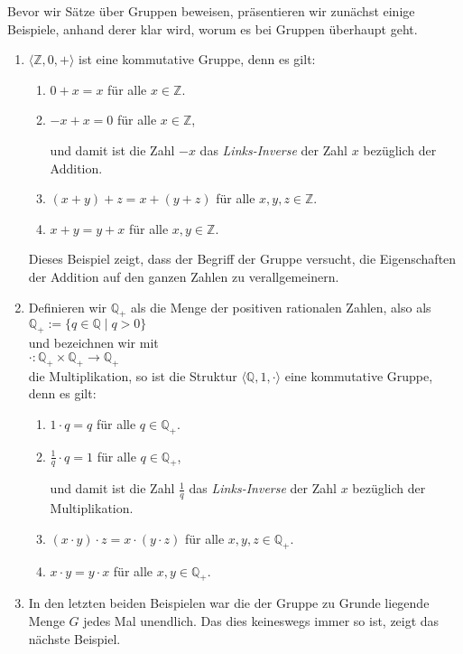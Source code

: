 \examples
Bevor wir S\"{a}tze \"{u}ber Gruppen beweisen, pr\"{a}sentieren wir zun\"{a}chst einige Beispiele, anhand
derer klar wird, worum es bei Gruppen \"{u}berhaupt geht.
\begin{enumerate}
\item $\langle \mathbb{Z}, 0, + \rangle$ ist eine kommutative Gruppe, denn es gilt:
      \begin{enumerate}
      \item $0 + x = x$ \quad f\"{u}r alle $x \in \mathbb{Z}$.
      \item $-x + x = 0$ \quad f\"{u}r alle $x \in \mathbb{Z}$,
        
            und damit ist die Zahl $-x$ das \emph{\color{blue}Links-Inverse} der Zahl $x$ bez\"{u}glich
            der Addition.
      \item $(x + y) + z = x + (y + z)$ \quad f\"{u}r alle $x,y,z \in \mathbb{Z}$.
      \item $x + y = y + x$ \quad f\"{u}r alle $x,y \in \mathbb{Z}$.
      \end{enumerate}
      Dieses Beispiel zeigt, dass der Begriff der Gruppe versucht, die Eigenschaften der
      Addition auf den ganzen Zahlen zu verallgemeinern.
\item Definieren wir $\mathbb{Q}_+$ als die Menge der positiven rationalen Zahlen, also als
      \\[0.2cm]
      \hspace*{1.3cm}
      $\mathbb{Q}_+ := \{ q \in \mathbb{Q} \mid q > 0 \}$
      \\[0.2cm]
      und bezeichnen wir mit
      \\[0.2cm]
      \hspace*{1.3cm}
      $\cdot : \mathbb{Q}_+ \times \mathbb{Q}_+ \rightarrow \mathbb{Q}_+$
      \\[0.2cm]
      die Multiplikation, so ist die Struktur $\langle \mathbb{Q}, 1, \cdot \rangle$ eine
      kommutative Gruppe, denn es gilt: 
      \begin{enumerate}
      \item $1 \cdot q = q$ \quad f\"{u}r alle $q \in \mathbb{Q}_+$.
      \item $\frac{1}{q} \cdot q = 1$ \quad f\"{u}r alle $q \in \mathbb{Q}_+$,
        
            und damit ist die Zahl $\frac{1}{q}$ das \emph{\color{blue}Links-Inverse} der Zahl $x$ bez\"{u}glich der
            Multiplikation.
      \item $(x \cdot y) \cdot z = x \cdot (y \cdot z)$ \quad f\"{u}r alle $x,y,z \in \mathbb{Q}_+$.
      \item $x \cdot y = y \cdot x$ \quad f\"{u}r alle $x,y \in \mathbb{Q}_+$.
      \end{enumerate}
\item In den letzten beiden Beispielen war die der Gruppe zu Grunde liegende Menge $G$
      jedes Mal unendlich.  Das dies keineswegs immer so ist, zeigt das n\"{a}chste Beispiel.


\end{enumerate}

